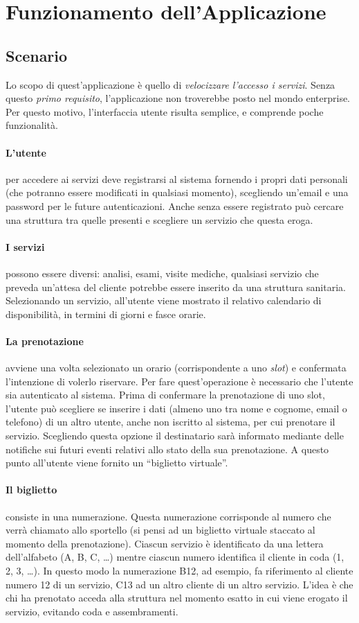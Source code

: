 \section{Funzionamento dell'Applicazione}

\subsection{Scenario}
Lo scopo di quest'applicazione è quello di \textit{velocizzare l'accesso i servizi}. Senza questo \textit{primo requisito}, l'applicazione non troverebbe posto nel mondo enterprise. Per questo motivo, l'interfaccia utente risulta semplice, e comprende poche funzionalità. 
\paragraph{L'utente} per accedere ai servizi deve registrarsi al sistema fornendo i propri dati personali (che potranno essere modificati in qualsiasi momento), scegliendo un'email e una password per le future autenticazioni. Anche senza essere registrato può cercare una struttura tra quelle presenti e scegliere un servizio che questa eroga. 
\paragraph{I servizi} possono essere diversi: analisi, esami, visite mediche, qualsiasi servizio che preveda un'attesa del cliente potrebbe essere inserito da una struttura sanitaria. Selezionando un servizio, all'utente viene mostrato il relativo calendario di disponibilità, in termini di giorni e fasce orarie. 
\paragraph{La prenotazione} avviene una volta selezionato un orario (corrispondente a uno \emph{slot}) e confermata l'intenzione di volerlo riservare. Per fare quest'operazione è necessario che l'utente sia autenticato al sistema. Prima di confermare la prenotazione di uno slot, l'utente può scegliere se inserire i dati (almeno uno tra nome e cognome, email o telefono) di un altro utente, anche non iscritto al sistema, per cui prenotare il servizio. Scegliendo questa opzione il destinatario sarà informato mediante delle notifiche sui futuri eventi relativi allo stato della sua prenotazione. A questo punto all'utente viene fornito un ``biglietto virtuale''.
\paragraph{Il biglietto} consiste in una numerazione. Questa numerazione corrisponde al numero che verrà chiamato allo sportello (si pensi ad un biglietto virtuale staccato al momento della prenotazione). Ciascun servizio è identificato da una lettera dell’alfabeto (A, B, C, \dots) mentre ciascun numero identifica il cliente in coda (1, 2, 3, \dots). In questo modo la numerazione B12, ad esempio, fa riferimento al cliente numero 12 di un servizio, C13 ad un altro cliente di un altro servizio. L’idea è che chi ha prenotato acceda alla struttura nel momento esatto in cui viene erogato il servizio, evitando coda e assembramenti.
